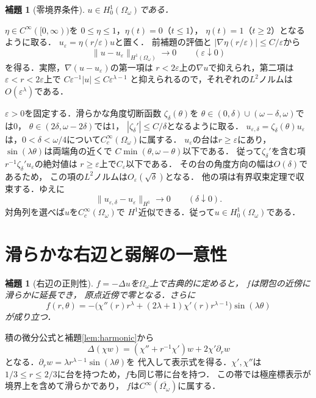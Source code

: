 \documentclass[a5paper,10pt,onecolumn]{jsarticle}
\makeatletter
\theoremstyle{mathnotetheorem}
\newtheorem{lemma}[theorem]{補題}
\renewcommand{\proofname}{証明}
\renewenvironment{proof}[1][\proofname]{%
  \par\pushQED{\qed}\normalfont\topsep4\p@\@plus2\p@\relax
  \trivlist\item[\hskip\labelsep\bfseries #1]\ignorespaces
}{\popQED\endtrivlist\@endpefalse}
\makeatother
\begin{document}
\begin{lemma}[零境界条件]\label{lem:H0}
$u\in H_0^1(\Omega_\omega)$である．
\end{lemma}
\begin{proof}
$\eta\in C^\infty([0,\infty))$を
$0\le\eta\le1$，$\eta(t)=0$（$t\le1$），
$\eta(t)=1$（$t\ge2$）となるように取る．
$u_\varepsilon=\eta(r/\varepsilon)u$と置く．
前補題の評価と
$|\nabla\eta(r/\varepsilon)|\le C/\varepsilon$から
\[
 \|u-u_\varepsilon\|_{H^1(\Omega_\omega)}
       \longrightarrow0\qquad(\varepsilon\downarrow0)
\]
を得る．実際，$\nabla(u-u_\varepsilon)$の第一項は
$r<2\varepsilon$上の$\nabla u$で抑えられ，第二項は
$\varepsilon<r<2\varepsilon$上で
$C\varepsilon^{-1}|u|\le C\varepsilon^{\lambda-1}$
と抑えられるので，それぞれの$L^2$ノルムは
$O(\varepsilon^\lambda)$である．

$\varepsilon>0$を固定する．滑らかな角度切断函数
$\zeta_\delta(\theta)$を
$\theta\in(0,\delta)\cup(\omega-\delta,\omega)$では0，
$\theta\in(2\delta,\omega-2\delta)$では1，
$|\zeta_\delta'|\le C/\delta$となるように取る．
$u_{\varepsilon,\delta}=\zeta_\delta(\theta)u_\varepsilon$
は，$0<\delta<\omega/4$について$C_c^\infty(\Omega_\omega)$に属する．
$u_\varepsilon$の台は$r\ge\varepsilon$にあり，
$\sin(\lambda\theta)$は両端角の近くで
$C\min(\theta,\omega-\theta)$以下である．
従って$\zeta_\delta'$を含む項
$r^{-1}\zeta_\delta' u_\varepsilon$の絶対値は
$r\ge\varepsilon$上で$C_\varepsilon$以下である．
その台の角度方向の幅は$O(\delta)$であるため，
この項の$L^2$ノルムは$O_\varepsilon(\sqrt\delta)$となる．
他の項は有界収束定理で収束する．ゆえに
\[
 \|u_{\varepsilon,\delta}-u_\varepsilon\|_{H^1}
   \longrightarrow0\qquad(\delta\downarrow0).
\]
対角列を選べば$u$を$C_c^\infty(\Omega_\omega)$で
$H^1$近似できる．従って$u\in H_0^1(\Omega_\omega)$である．
\end{proof}

\section{滑らかな右辺と弱解の一意性}
\begin{lemma}[右辺の正則性]\label{lem:rhs}
$f=-\Delta u$を$\Omega_\omega$上で古典的に定めると，
$f$は閉包の近傍に滑らかに延長でき，
原点近傍で零となる．さらに
\[
 f(r,\theta)=-\bigl(\chi''(r)r^\lambda
      +(2\lambda+1)\chi'(r)r^{\lambda-1}\bigr)
      \sin(\lambda\theta)
\]
が成り立つ．
\end{lemma}
\begin{proof}
積の微分公式と補題\ref{lem:harmonic}から
\[
 \Delta(\chi w)=(\chi''+r^{-1}\chi')w
                +2\chi'\partial_rw
\]
となる．$\partial_rw=\lambda r^{\lambda-1}\sin(\lambda\theta)$を
代入して表示式を得る．$\chi',\chi''$は
$1/3\le r\le2/3$に台を持つため，$f$も同じ帯に台を持つ．
この帯では極座標表示が境界上を含めて滑らかであり，
$f$は$C^\infty(\overline{\Omega_\omega})$に属する．
\end{proof}
\end{document}

